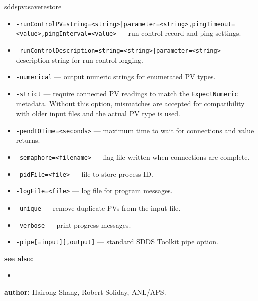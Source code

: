 \begin{sddsprog}{sddspvasaverestore}
\begin{itemize}
  \item {\tt -runControlPV={string=<string>|parameter=<string>},pingTimeout=<value>,pingInterval=<value>} --- run control record and ping settings.
  \item {\tt -runControlDescription={string=<string>|parameter=<string>}} --- description string for run control logging.
  \item {\tt -numerical} --- output numeric strings for enumerated PV types.
  \item {\tt -strict} --- require connected PV readings to match the
    \verb|ExpectNumeric| metadata. Without this option, mismatches are accepted
    for compatibility with older input files and the actual PV type is used.
  \item {\tt -pendIOTime=<seconds>} --- maximum time to wait for connections and value returns.
  \item {\tt -semaphore=<filename>} --- flag file written when connections are complete.
  \item {\tt -pidFile=<file>} --- file to store process ID.
  \item {\tt -logFile=<file>} --- log file for program messages.
  \item {\tt -unique} --- remove duplicate PVs from the input file.
  \item {\tt -verbose} --- print progress messages.
  \item {\tt -pipe[=input][,output]} --- standard SDDS Toolkit pipe option.
\end{itemize}
\item \textbf{see also:}
\begin{itemize}
  \item {}
\end{itemize}
\item \textbf{author:} Hairong Shang, Robert Soliday, ANL/APS.
\end{sddsprog}
